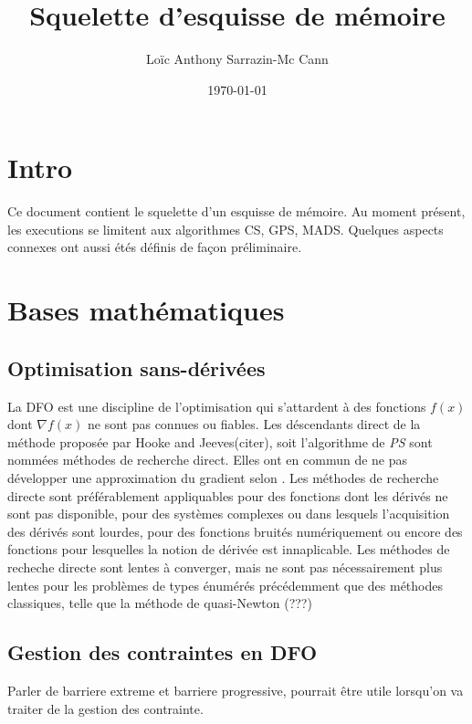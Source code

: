 \documentclass[letterpaper]{scrartcl}
\author{Loïc Anthony Sarrazin-Mc Cann}
\title{Squelette d'esquisse de mémoire}
\date{\today}
\begin{document}
\maketitle
\section{Intro}
Ce document contient le squelette d'un esquisse de mémoire. Au moment présent, les executions se limitent aux algorithmes CS, GPS, MADS. Quelques aspects connexes ont aussi étés définis de façon préliminaire.
\section{Bases mathématiques}
	\subsection{Optimisation sans-dérivées}
	La DFO est une discipline de l'optimisation qui s'attardent à des fonctions $f(x)$ dont $\nabla f(x)$ ne sont pas connues ou fiables. Les déscendants direct de la méthode proposée par Hooke and Jeeves(citer), soit l'algorithme de \textit{PS} sont nommées méthodes de recherche direct. Elles ont en commun de ne pas développer une approximation du gradient selon \cite{KoLeTo03a}. Les méthodes de recherche directe sont préférablement appliquables pour des fonctions dont les dérivés ne sont pas disponible, pour des systèmes complexes ou dans lesquels l'acquisition des dérivés sont lourdes, pour des fonctions bruités numériquement ou encore des fonctions pour lesquelles la notion de dérivée est innaplicable. Les méthodes de recheche directe sont lentes à converger, mais ne sont pas nécessairement plus lentes pour les problèmes de types énumérés précédemment que des méthodes classiques, telle que la méthode de quasi-Newton (???)
	\subsection{Gestion des contraintes en DFO}
	Parler de barriere extreme et barriere progressive, pourrait être utile lorsqu'on va traiter de la gestion des contrainte.
\end{document}
